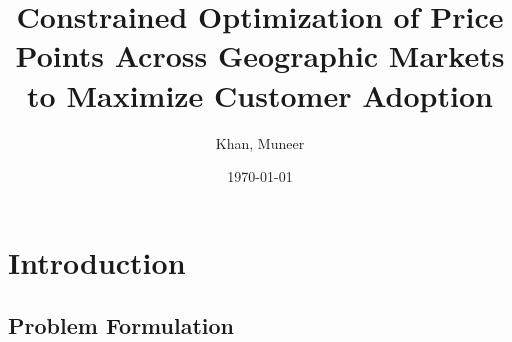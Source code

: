 \documentclass[11pt, titlepage]{report}
\author{Khan, Muneer}
\title{\textbf{Constrained Optimization of Price Points Across Geographic Markets to Maximize Customer Adoption}}
\date{\today}
\begin{document}
\maketitle

\chapter{Introduction} 
\section{Problem Formulation}
\end{document}
